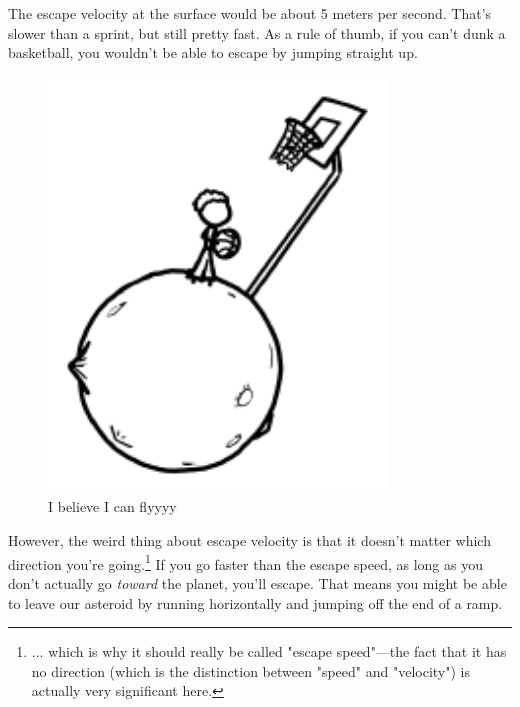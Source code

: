 {{The escape velocity at the surface would be about 5 meters per second. That's slower than a sprint, but still pretty fast. As a rule of thumb, if you can't dunk a basketball, you wouldn't be able to escape by jumping straight up.}

\begin{figure}[!htbp]
\centering
\includegraphics[scale=0.5, max width=0.8\textwidth]{imgs/a/68/asteroid_basketball.png}
\caption{I believe I can flyyyy}
\end{figure}

{However, the weird thing about escape velocity is that it doesn't matter which direction you're going.{\footnote{... which is why it should really be called "escape speed"—the fact that it has no direction (which is the distinction between "speed" and "velocity") is actually very significant here.} } If you go faster than the escape speed, as long as you don't actually go \emph{toward} the planet, you'll escape. That means you might be able to leave our asteroid by running horizontally and jumping off the end of a ramp.}

}

